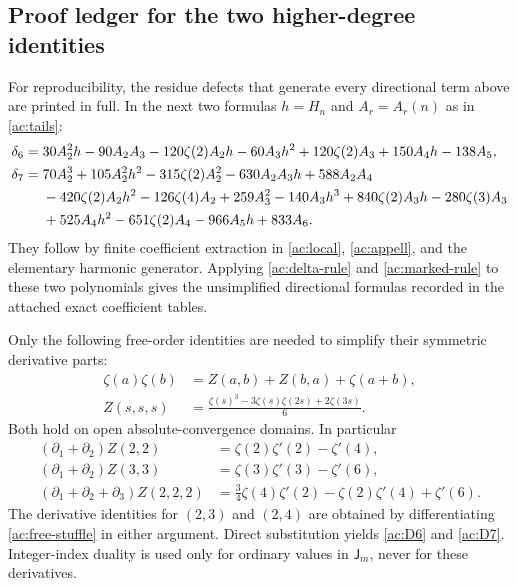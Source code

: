 \documentclass[11pt,a4paper]{article}
\numberwithin{equation}{section}
\theoremstyle{definition}
\theoremstyle{remark}
\begin{document}
\subsection{Proof ledger for the two higher-degree identities}

For reproducibility, the residue defects that generate every
directional term above are printed in full. In the next two formulas
$h=H_n$ and $A_r=A_r(n)$ as in \eqref{ac:tails}:
\begin{align}\label{ac:delta6}
 \delta_6={}&30A_2^2h-90A_2A_3-120\zeta(2)A_2h
       -60A_3h^2+120\zeta(2)A_3+150A_4h-138A_5,\\
 \delta_7={}&70A_2^3+105A_2^2h^2-315\zeta(2)A_2^2
       -630A_2A_3h+588A_2A_4\notag\\
 &-420\zeta(2)A_2h^2-126\zeta(4)A_2+259A_3^2
       -140A_3h^3+840\zeta(2)A_3h-280\zeta(3)A_3\notag\\
 &+525A_4h^2-651\zeta(2)A_4-966A_5h+833A_6.
       \label{ac:delta7}
\end{align}
They follow by finite coefficient extraction in \eqref{ac:local},
\eqref{ac:appell}, and the elementary harmonic generator. Applying
\eqref{ac:delta-rule} and \eqref{ac:marked-rule} to these two
polynomials gives the unsimplified directional formulas recorded
in the attached exact coefficient tables.

Only the following free-order identities are needed to simplify
their symmetric derivative parts:
\begin{align}
 \zeta(a)\zeta(b)&=Z(a,b)+Z(b,a)+\zeta(a+b),\label{ac:free-stuffle}\\
 Z(s,s,s)&=\frac{\zeta(s)^3-3\zeta(s)\zeta(2s)+2\zeta(3s)}6.
       \label{ac:equal-triple}
\end{align}
Both hold on open absolute-convergence domains. In particular
\begin{align*}
 (\partial_1+\partial_2)Z(2,2)
       &=\zeta(2)\zeta'(2)-\zeta'(4),\\
 (\partial_1+\partial_2)Z(3,3)
       &=\zeta(3)\zeta'(3)-\zeta'(6),\\
 (\partial_1+\partial_2+\partial_3)Z(2,2,2)
       &=\frac34\zeta(4)\zeta'(2)-\zeta(2)\zeta'(4)+\zeta'(6).
\end{align*}
The derivative identities for $(2,3)$ and $(2,4)$ are obtained by
differentiating \eqref{ac:free-stuffle} in either argument. Direct
substitution yields \eqref{ac:D6} and \eqref{ac:D7}. Integer-index
duality is used only for ordinary values in $\mathsf J_m$, never
for these derivatives.
\end{document}
